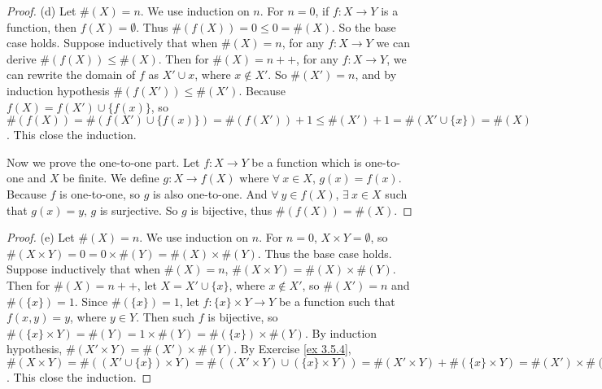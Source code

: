 \begin{proof}{(d)}
Let \(\#(X) = n\).
We use induction on \(n\).
For \(n = 0\), if \(f : X \to Y\) is a function, then \(f(X) = \emptyset\).
Thus \(\#(f(X)) = 0 \leq 0 = \#(X)\).
So the base case holds.
Suppose inductively that when \(\#(X) = n\), for any \(f : X \to Y\) we can derive \(\#(f(X)) \leq \#(X)\).
Then for \(\#(X) = n++\), for any \(f : X \to Y\), we can rewrite the domain of \(f\) as \(X' \cup x\), where \(x \notin X'\).
So \(\#(X') = n\), and by induction hypothesis \(\#(f(X')) \leq \#(X')\).
Because \(f(X) = f(X') \cup \{f(x)\}\), so \(\#(f(X)) = \#(f(X') \cup \{f(x)\}) = \#(f(X')) + 1 \leq \#(X') + 1 = \#(X' \cup \{x\}) = \#(X)\).
This close the induction.

Now we prove the one-to-one part.
Let \(f : X \to Y\) be a function which is one-to-one and \(X\) be finite.
We define \(g : X \to f(X)\) where \(\forall\ x \in X\), \(g(x) = f(x)\).
Because \(f\) is one-to-one, so \(g\) is also one-to-one.
And \(\forall\ y \in f(X)\), \(\exists\ x \in X\) such that \(g(x) = y\), \(g\) is surjective.
So \(g\) is bijective, thus \(\#(f(X)) = \#(X)\).
\end{proof}

\begin{proof}{(e)}
Let \(\#(X) = n\).
We use induction on \(n\).
For \(n = 0\), \(X \times Y = \emptyset\), so \(\#(X \times Y) = 0 = 0 \times \#(Y) = \#(X) \times \#(Y)\).
Thus the base case holds.
Suppose inductively that when \(\#(X) = n\), \(\#(X \times Y) = \#(X) \times \#(Y)\).
Then for \(\#(X) = n++\), let \(X = X' \cup \{x\}\), where \(x \notin X'\), so \(\#(X') = n\) and \(\#(\{x\}) = 1\).
Since \(\#(\{x\}) = 1\), let \(f : \{x\} \times Y \to Y\) be a function such that \(f(x, y) = y\), where \(y \in Y\).
Then such \(f\) is bijective, so \(\#(\{x\} \times Y) = \#(Y) = 1 \times \#(Y) = \#(\{x\}) \times \#(Y)\).
By induction hypothesis, \(\#(X' \times Y) = \#(X') \times \#(Y)\).
By Exercise \ref{ex 3.5.4}, \(\#(X \times Y) = \#((X' \cup \{x\}) \times Y) = \#((X' \times Y) \cup (\{x\} \times Y)) = \#(X' \times Y) + \#(\{x\} \times Y) = \#(X') \times \#(Y) + \#(\{x\}) \times \#(Y) = (\#(X') + \#(\{x\})) \times \#(Y) = \#(X) \times \#(Y)\).
This close the induction.
\end{proof}

